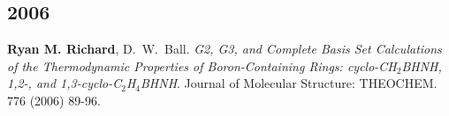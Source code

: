 \begin{etaremune}
	\subsection{2006}
	\item{\textbf{Ryan M. Richard}, D.~W.~Ball. {\em G2, G3, and Complete Basis 
	      Set Calculations of the Thermodynamic Properties of Boron-Containing 
		  Rings: cyclo-CH$_2$BHNH, 1,2-, and 1,3-cyclo-C$_2$H$_4$BHNH}. Journal 
		  of Molecular Structure: THEOCHEM.  776 (2006) 89-96. }
\end{etaremune}